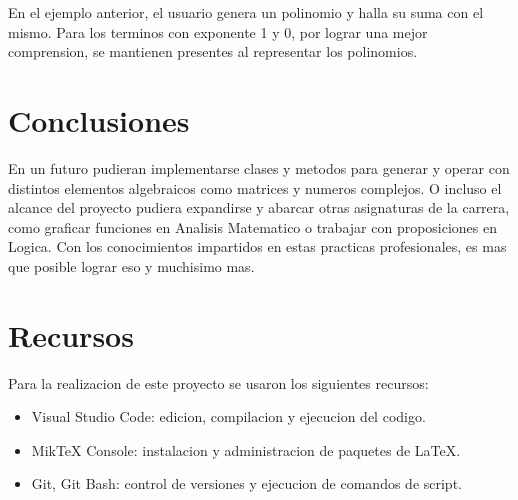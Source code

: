 \documentclass[a4paper,12pt]{article}
\begin{document}
En el ejemplo anterior, el usuario genera un polinomio y halla su suma con el mismo. Para los terminos con exponente 1 y 0, por lograr una mejor comprension, se mantienen presentes al representar los polinomios.

\newpage

\section{Conclusiones}
En un futuro pudieran implementarse clases y metodos para generar y operar con distintos elementos algebraicos como matrices y numeros complejos. O incluso el alcance del proyecto pudiera expandirse y abarcar otras asignaturas de la carrera, como graficar funciones en Analisis Matematico o trabajar con proposiciones en Logica. Con los conocimientos impartidos en estas practicas profesionales, es mas que posible lograr eso y muchisimo mas.

\section{Recursos}
Para la realizacion de este proyecto se usaron los siguientes recursos:
\begin{itemize}
    \item Visual Studio Code: edicion, compilacion y ejecucion del codigo.
    \item MikTeX Console: instalacion y administracion de paquetes de \LaTeX.
    \item Git, Git Bash: control de versiones y ejecucion de comandos de script.
\end{itemize}
\end{document}
